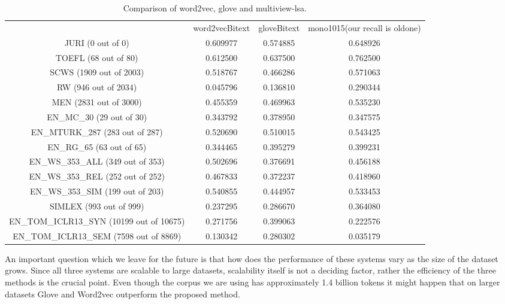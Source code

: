 \documentclass[11pt]{article}
\begin{document}
\begin{table*}[htbp]
  \centering
  \begin{tabular}{cccc}
                                     & word2vecBitext &  gloveBitext & mono1015(our recall is oldone)\\
JURI (0 out of 0)                    &  0.609977      &     0.574885 &  0.648926 \\
TOEFL (68 out of 80)                 &  0.612500      &     0.637500 &  0.762500 \\
SCWS (1909 out of 2003)              &  0.518767      &     0.466286 &  0.571063 \\
RW (946 out of 2034)                 &  0.045796      &     0.136810 &  0.290344 \\
MEN (2831 out of 3000)               &  0.455359      &     0.469963 &  0.535230 \\
EN\_MC\_30 (29 out of 30)              &  0.343792      &     0.378950 &  0.347575 \\
EN\_MTURK\_287 (283 out of 287)        &  0.520690      &     0.510015 &  0.543425 \\
EN\_RG\_65 (63 out of 65)              &  0.344465      &     0.395279 &  0.399231 \\
EN\_WS\_353\_ALL (349 out of 353)       &  0.502696      &     0.376691 &  0.456188 \\
EN\_WS\_353\_REL (252 out of 252)       &  0.467833      &     0.372237 &  0.418960 \\
EN\_WS\_353\_SIM (199 out of 203)       &  0.540855      &     0.444957 &  0.533453 \\
SIMLEX (993 out of 999)             &   0.237295     &      0.286670 &  0.364080 \\
EN\_TOM\_ICLR13\_SYN (10199 out of 10675) & 0.271756    &       0.399063 &  0.222576 \\
EN\_TOM\_ICLR13\_SEM (7598 out of 8869) &  0.130342     &      0.280302  & 0.035179 \\
  \end{tabular}
  \caption{Comparison of word2vec, glove and multiview-lsa.}
  \label{tab:comparison}
\end{table*}


An important question which we leave for the future is that how does
the performance of these systems vary as the size of the dataset
grows. Since all three systems are scalable to large datasets,
scalability itself is not a deciding factor, rather the efficiency of
the three methods is the crucial point. Even though the corpus we are
using has approximately 1.4 billion tokens it might happen that on
larger datasets Glove and Word2vec outperform the proposed method. 
\end{document}
